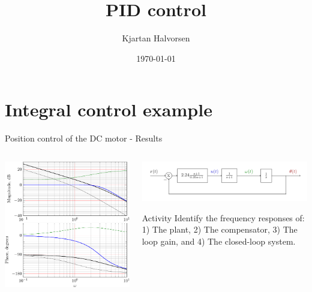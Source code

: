 \documentclass[presentation,aspectratio=169, usenames, dvipsnames]{beamer}
\author{Kjartan Halvorsen}
\date{\today}
\title{PID control}
\begin{document}
\maketitle

\section{Integral control example}
\label{sec:org1fe3305}

\begin{frame}[label={sec:orgf306161}]{Position control of the DC motor - Results}
\begin{columns}
\begin{column}{0.5\columnwidth}
\begin{center}
  \includegraphics[width=1.0\linewidth]{../../figures/bode-loop-gain-lead-normalized-DC-crop}
\end{center}
\end{column}


\begin{column}{0.4\columnwidth}
\begin{center}
 \includegraphics[width=1.1\linewidth]{../../figures/block-DC-lead-compensator-numerical}
\end{center}

\alert{Activity} Identify the frequency responses of: 1) The plant, 2) The compensator, 3) The loop gain, and 4) The closed-loop system.
\end{column}
\end{columns}
\end{frame}
\end{document}
